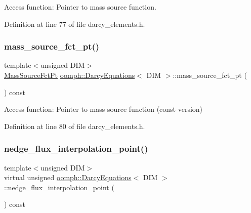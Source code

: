 Access function\+: Pointer to mass source function. 



Definition at line 77 of file darcy\+\_\+elements.\+h.

\mbox{\label{classoomph_1_1DarcyEquations_a076ef9f7b1292436e7fd522476c73fc5}} 
\subsubsection{\texorpdfstring{mass\+\_\+source\+\_\+fct\+\_\+pt()}{mass\_source\_fct\_pt()}\hspace{0.1cm}{\footnotesize\ttfamily [2/2]}}
{\footnotesize\ttfamily template$<$unsigned D\+IM$>$ \\
\hyperlink{classoomph_1_1DarcyEquations_abb20685508a2704d195f3b8e124d20b4}{Mass\+Source\+Fct\+Pt} \hyperlink{classoomph_1_1DarcyEquations}{oomph\+::\+Darcy\+Equations}$<$ D\+IM $>$\+::mass\+\_\+source\+\_\+fct\+\_\+pt (\begin{DoxyParamCaption}{ }\end{DoxyParamCaption}) const\hspace{0.3cm}{\ttfamily [inline]}}



Access function\+: Pointer to mass source function (const version) 



Definition at line 80 of file darcy\+\_\+elements.\+h.

\mbox{\label{classoomph_1_1DarcyEquations_a4e09bc2cc0d08dc6dd43580c2a45d5c4}} 
\subsubsection{\texorpdfstring{nedge\+\_\+flux\+\_\+interpolation\+\_\+point()}{nedge\_flux\_interpolation\_point()}}
{\footnotesize\ttfamily template$<$unsigned D\+IM$>$ \\
virtual unsigned \hyperlink{classoomph_1_1DarcyEquations}{oomph\+::\+Darcy\+Equations}$<$ D\+IM $>$\+::nedge\+\_\+flux\+\_\+interpolation\+\_\+point (\begin{DoxyParamCaption}{ }\end{DoxyParamCaption}) const\hspace{0.3cm}{\ttfamily [pure virtual]}}



